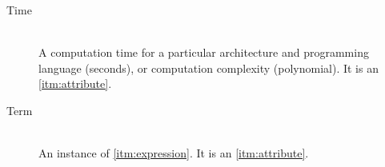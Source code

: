 \begin{description}
\item[Time\label{itm:time}] \hfill \\ A computation time for a particular architecture and programming language (seconds), or computation complexity (polynomial). It is an \ref{itm:attribute}.

\item[Term\label{itm:term}] \hfill \\ An instance of \ref{itm:expression}. It is an \ref{itm:attribute}.


\end{description}
